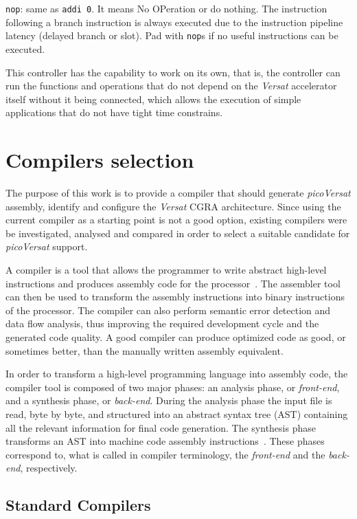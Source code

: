 \documentclass[journal]{IEEEtran}
\begin{document}
{\tt nop}: same as {\tt addi 0}. It means No OPeration or do nothing.  The
instruction following a branch instruction is always executed due to the
instruction pipeline latency (delayed branch or slot).  Pad with {\tt nop}s if
no useful instructions can be executed.

This controller has the capability to work on its own, that is, the controller
can run the functions and operations that do not depend on the {\it Versat}
accelerator itself without it being connected, which allows the execution of
simple applications that do not have tight time constrains.


\section{Compilers selection} %
\label{section:compilers}

The purpose of this work is to provide a compiler that should generate
{\em picoVersat} assembly, identify and configure the {\em Versat} {\sc
  CGRA} architecture.
Since using the current compiler as a starting point is not a good option,
existing compilers were be investigated, analysed and compared in order to
select a suitable candidate for {\em picoVersat} support.

A compiler is a tool that allows the programmer to write abstract high-level
instructions and produces assembly code for the processor~\cite{aho06,cooper03}.
The assembler tool can then be used to transform the assembly instructions into
binary instructions of the processor.  The compiler can also perform semantic
error detection and data flow analysis, thus improving the required development
cycle and the generated code quality.  A good compiler can produce optimized
code as good, or sometimes better, than the manually written assembly
equivalent.

In order to transform a high-level programming language into assembly code, the
compiler tool is composed of two major phases: an analysis phase, or {\it front-end},
and a synthesis phase, or {\it back-end}.
During the analysis phase the input file is read, byte by byte, and
structured into an abstract syntax tree ({\sc AST}) containing all the relevant
information for final code generation.  The synthesis phase transforms an {\sc
  AST} into machine code assembly instructions~\cite{cooper03}.  These phases
correspond to, what is called in compiler terminology, the {\it front-end} and the
{\it back-end}, respectively.

\subsection{Standard Compilers}
\end{document}
